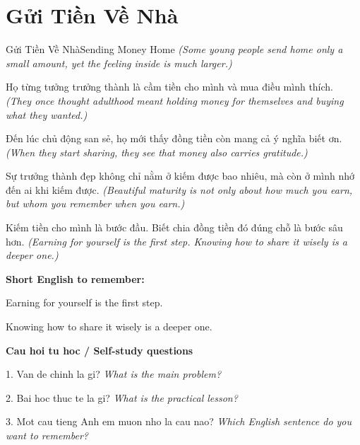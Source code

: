 \section{Gửi Tiền Về Nhà}
\begin{truyen}{Gửi Tiền Về Nhà}{Sending Money Home}
\textit{(Some young people send home only a small amount, yet the feeling inside is much larger.)}

Họ từng tưởng trưởng thành là cầm tiền cho mình và mua điều mình thích.
\textit{(They once thought adulthood meant holding money for themselves and buying what they wanted.)}

Đến lúc chủ động san sẻ, họ mới thấy đồng tiền còn mang cả ý nghĩa biết ơn.
\textit{(When they start sharing, they see that money also carries gratitude.)}

Sự trưởng thành đẹp không chỉ nằm ở kiếm được bao nhiêu, mà còn ở mình nhớ đến ai khi kiếm được.
\textit{(Beautiful maturity is not only about how much you earn, but whom you remember when you earn.)}

\end{truyen}

\begin{baihoc}
Kiếm tiền cho mình là bước đầu. Biết chia đồng tiền đó đúng chỗ là bước sâu hơn.
\textit{(Earning for yourself is the first step. Knowing how to share it wisely is a deeper one.)}
\end{baihoc}

\begin{ghinhoanh}
\textbf{Short English to remember:}

Earning for yourself is the first step.

Knowing how to share it wisely is a deeper one.

\end{ghinhoanh}

\begin{tuhocnhanh}
\textbf{Cau hoi tu hoc / Self-study questions}

1. Van de chinh la gi? \textit{What is the main problem?}

2. Bai hoc thuc te la gi? \textit{What is the practical lesson?}

3. Mot cau tieng Anh em muon nho la cau nao? \textit{Which English sentence do you want to remember?}
\end{tuhocnhanh}
